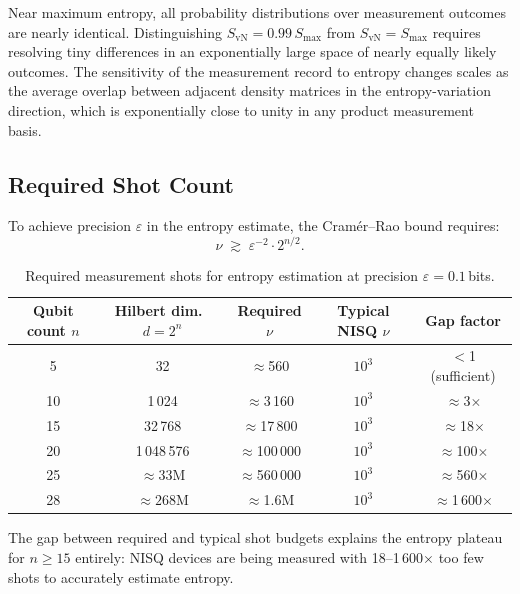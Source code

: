 \documentclass[12pt,letterpaper]{article}
\theoremstyle{plain}
\theoremstyle{definition}
\newcommand{\SvN}{S_{\mathrm{vN}}}
\begin{document}
Near maximum entropy, all probability distributions over measurement outcomes are nearly
identical.  Distinguishing $\SvN = 0.99\,S_{\max}$ from $\SvN = S_{\max}$ requires resolving
tiny differences in an exponentially large space of nearly equally likely outcomes.  The
sensitivity of the measurement record to entropy changes scales as the average overlap between
adjacent density matrices in the entropy-variation direction, which is exponentially close to
unity in any product measurement basis.

\subsection{Required Shot Count}

To achieve precision $\varepsilon$ in the entropy estimate, the Cram\'{e}r--Rao bound requires:
\begin{equation}
  \nu
  \;\gtrsim\;
  \varepsilon^{-2}\cdot 2^{n/2}.
  \label{eq:shot-scaling}
\end{equation}

\begin{table}[h]
\centering
\caption{Required measurement shots for entropy estimation at precision $\varepsilon = 0.1$\,bits.}
\label{tab:shots}
\begin{tabular}{@{}ccccc@{}}
\toprule
Qubit count $n$ & Hilbert dim.\ $d=2^{n}$ & Required $\nu$ & Typical NISQ $\nu$ & Gap factor \\
\midrule
5  & 32          & $\approx$560       & $10^{3}$ & $<$1 (sufficient) \\
10 & 1\,024      & $\approx$3\,160    & $10^{3}$ & $\approx$3$\times$ \\
15 & 32\,768     & $\approx$17\,800   & $10^{3}$ & $\approx$18$\times$ \\
20 & 1\,048\,576 & $\approx$100\,000  & $10^{3}$ & $\approx$100$\times$ \\
25 & $\approx33$M & $\approx$560\,000 & $10^{3}$ & $\approx$560$\times$ \\
28 & $\approx268$M & $\approx$1.6M    & $10^{3}$ & $\approx$1\,600$\times$ \\
\bottomrule
\end{tabular}
\end{table}

The gap between required and typical shot budgets explains the entropy plateau for
$n \geq 15$ entirely: NISQ devices are being measured with 18--1\,600$\times$ too few shots to
accurately estimate entropy.
\end{document}
